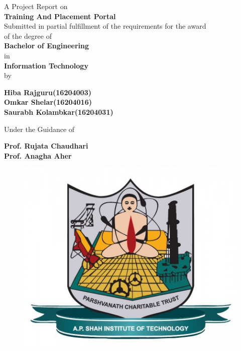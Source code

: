 \begin{titlepage}
\vspace*{0.25cm}
{\centering
A Project Report on\\
\vspace{0.5cm}
{\Large\textbf {Training And Placement Portal}}\\
\vspace{1cm}
 Submitted in partial fulfillment of the requirements for the award\\
of the degree of\\ \vspace{1cm}
{\large\textbf {Bachelor of Engineering}}\\
\vspace{0.5cm}
in \\
\vspace{0.5cm}
{\large\textbf {Information Technology}}\\
\vspace{1cm}
by\\
\vspace{0.5cm}

{\large \textbf {Hiba Rajguru}\textbf {(16204003)}}\\
{\large \textbf {Omkar Shelar}\textbf {(16204016)}}\\
{\large \textbf {Saurabh Kolambkar}\textbf {(16204031)}}\\

\vspace{1cm}

Under the Guidance of\\ 
\vspace{0.3cm}

\hspace{.05cm} {\large \textbf {Prof. Rujata Chaudhari }}\\
\hspace{.05cm} {\large \textbf {Prof. Anagha Aher }}\\ 
\vspace{0.5cm}
\begin{figure}[h]
\centering
\includegraphics[scale=0.30]{apsit_logo.jpg}
\end{figure}

}
\end{titlepage}
